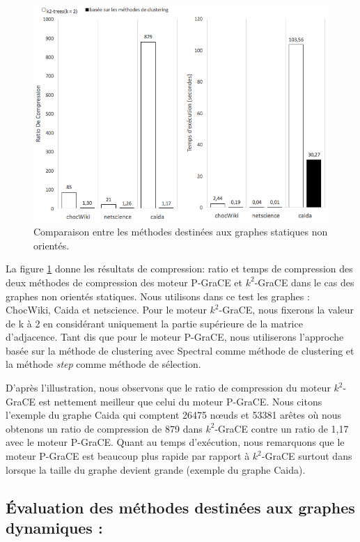 	\begin{figure}[H]
	\centering
	\includegraphics[scale=0.65]{ressources/image/vogk2.png}
	\caption{Comparaison entre les méthodes destinées aux graphes statiques non orientés.}
	\label{fig:K2-vog}
\end{figure}	

	La figure \ref{fig:K2-vog}  donne les résultats de compression: ratio et temps de compression des deux méthodes de compression des moteur P-GraCE et $k^2$-GraCE dans le cas des graphes non orientés statiques. Nous utilisons dans ce test les graphes : ChocWiki, Caida et netscience. Pour le moteur $k^2$-GraCE, nous fixerons la valeur de k à 2 en considérant uniquement la partie supérieure de la matrice d'adjacence. Tant dis que pour le moteur P-GraCE, nous utiliserons l'approche basée sur la méthode de clustering avec Spectral comme méthode de clustering et la méthode \textit{step} comme méthode de sélection.
	
	D'après l'illustration, nous observons que le ratio de compression du moteur $k^2$-GraCE  est nettement meilleur que celui du moteur P-GraCE. Nous citons l'exemple du graphe Caida qui comptent 26475 nœuds et 53381 arêtes où nous obtenons un ratio de compression de 879 dans $k^2$-GraCE contre un ratio de 1,17 avec le moteur P-GraCE. Quant au temps d'exécution, nous remarquons que le moteur P-GraCE  est beaucoup plus rapide par rapport à $k^2$-GraCE surtout dans lorsque la taille du graphe devient grande (exemple du graphe Caida).
 
	
	\subsection{Évaluation des méthodes destinées aux graphes dynamiques :}
	
